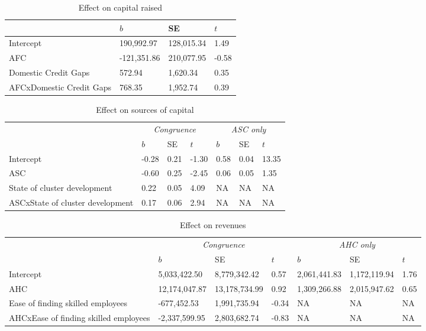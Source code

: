 \documentclass[
  english,
  man]{apa6}
\begin{document}
\begin{table}

\caption{\label{tab:unnamed-chunk-21}Effect on capital raised}
\centering
\begin{tabular}[t]{l|l|l|l}
\hline
  & $b$ & SE & $t$\\
\hline
Intercept & 190,992.97 & 128,015.34 & 1.49\\
\hline
AFC & -121,351.86 & 210,077.95 & -0.58\\
\hline
Domestic Credit Gaps & 572.94 & 1,620.34 & 0.35\\
\hline
AFCxDomestic Credit Gaps & 768.35 & 1,952.74 & 0.39\\
\hline
\end{tabular}
\end{table}

\begin{table}

\caption{\label{tab:unnamed-chunk-21}Effect on sources of capital}
\centering
\begin{tabular}[t]{l|l|l|l|l|l|l}
\hline
\multicolumn{1}{c|}{\em{ }} & \multicolumn{3}{c|}{\em{Congruence}} & \multicolumn{3}{c}{\em{ASC only}} \\
\cline{2-4} \cline{5-7}
  & $b$ & SE & $t$ & $b$ & SE & $t$\\
\hline
Intercept & -0.28 & 0.21 & -1.30 & 0.58 & 0.04 & 13.35\\
\hline
ASC & -0.60 & 0.25 & -2.45 & 0.06 & 0.05 & 1.35\\
\hline
State of cluster development & 0.22 & 0.05 & 4.09 & NA & NA & NA\\
\hline
ASCxState of cluster development & 0.17 & 0.06 & 2.94 & NA & NA & NA\\
\hline
\end{tabular}
\end{table}

\begin{table}

\caption{\label{tab:unnamed-chunk-24}Effect on revenues}
\centering
\fontsize{8}{10}\selectfont
\begin{tabular}[t]{l|l|l|l|l|l|l}
\hline
\multicolumn{1}{c|}{\em{ }} & \multicolumn{3}{c|}{\em{Congruence}} & \multicolumn{3}{c}{\em{AHC only}} \\
\cline{2-4} \cline{5-7}
  & $b$ & SE & $t$ & $b$ & SE & $t$\\
\hline
Intercept & 5,033,422.50 & 8,779,342.42 & 0.57 & 2,061,441.83 & 1,172,119.94 & 1.76\\
\hline
AHC & 12,174,047.87 & 13,178,734.99 & 0.92 & 1,309,266.88 & 2,015,947.62 & 0.65\\
\hline
Ease of finding skilled employees & -677,452.53 & 1,991,735.94 & -0.34 & NA & NA & NA\\
\hline
AHCxEase of finding skilled employees & -2,337,599.95 & 2,803,682.74 & -0.83 & NA & NA & NA\\
\hline
\end{tabular}
\end{table}
\end{document}
